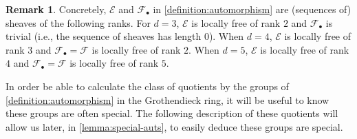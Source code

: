 \documentclass[12 pt]{amsart}
\theoremstyle{plain}
\theoremstyle{definition}
\newtheorem{remark}[theorem]{Remark}
\theoremstyle{remark}
\numberwithin{equation}{section}
\newcommand\sce{\mathscr E}
\newcommand\scf{\mathscr F}
\begin{document}
\begin{remark}
	\label{remark:sheaf-ranks}
	Concretely, $\sce$ and $\scf_\bullet$ in
	\autoref{definition:automorphism}
	are (sequences of) sheaves of the
	following ranks.
	For $d = 3$, $\sce$ is locally free of rank $2$ and $\scf_\bullet$ is trivial
	(i.e., the sequence of sheaves has length $0$).
	When $d = 4$, $\sce$ is locally free of rank $3$ and
$\scf_\bullet = \scf$ is locally free of rank $2$. 
When $d = 5$, $\sce$ is locally free of
rank $4$ and $\scf_\bullet = \scf$ is locally free of rank $5$.  
\end{remark}


In order be able to calculate the class of quotients by the groups of
\autoref{definition:automorphism} in the
Grothendieck ring, it will be useful to know these groups are often special.
The following description of these
quotients will allow us later, in \autoref{lemma:special-auts}, to easily
deduce these groups are special.
\end{document}
